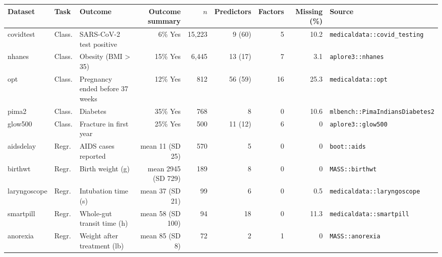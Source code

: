 \begin{tabular}{lllrrrrrl}
\toprule
Dataset & Task & Outcome & Outcome summary & $n$ & Predictors & Factors & Missing (\%) & Source \\
\midrule
covidtest & Class. & SARS-CoV-2 test positive & 6\% Yes & 15,223 & 9 (60) & 5 & 10.2 & \texttt{medicaldata::covid\_testing} \\
nhanes & Class. & Obesity (BMI > 35) & 15\% Yes & 6,445 & 13 (17) & 7 & 3.1 & \texttt{aplore3::nhanes} \\
opt & Class. & Pregnancy ended before 37 weeks & 12\% Yes & 812 & 56 (59) & 16 & 25.3 & \texttt{medicaldata::opt} \\
pima2 & Class. & Diabetes & 35\% Yes & 768 & 8 & 0 & 10.6 & \texttt{mlbench::PimaIndiansDiabetes2} \\
glow500 & Class. & Fracture in first year & 25\% Yes & 500 & 11 (12) & 6 & 0 & \texttt{aplore3::glow500} \\
aidsdelay & Regr. & AIDS cases reported & mean 11 (SD 25) & 570 & 5 & 0 & 0 & \texttt{boot::aids} \\
birthwt & Regr. & Birth weight (g) & mean 2945 (SD 729) & 189 & 8 & 0 & 0 & \texttt{MASS::birthwt} \\
laryngoscope & Regr. & Intubation time (s) & mean 37 (SD 21) & 99 & 6 & 0 & 0.5 & \texttt{medicaldata::laryngoscope} \\
smartpill & Regr. & Whole-gut transit time (h) & mean 58 (SD 100) & 94 & 18 & 0 & 11.3 & \texttt{medicaldata::smartpill} \\
anorexia & Regr. & Weight after treatment (lb) & mean 85 (SD 8) & 72 & 2 & 1 & 0 & \texttt{MASS::anorexia} \\
\bottomrule
\end{tabular}
